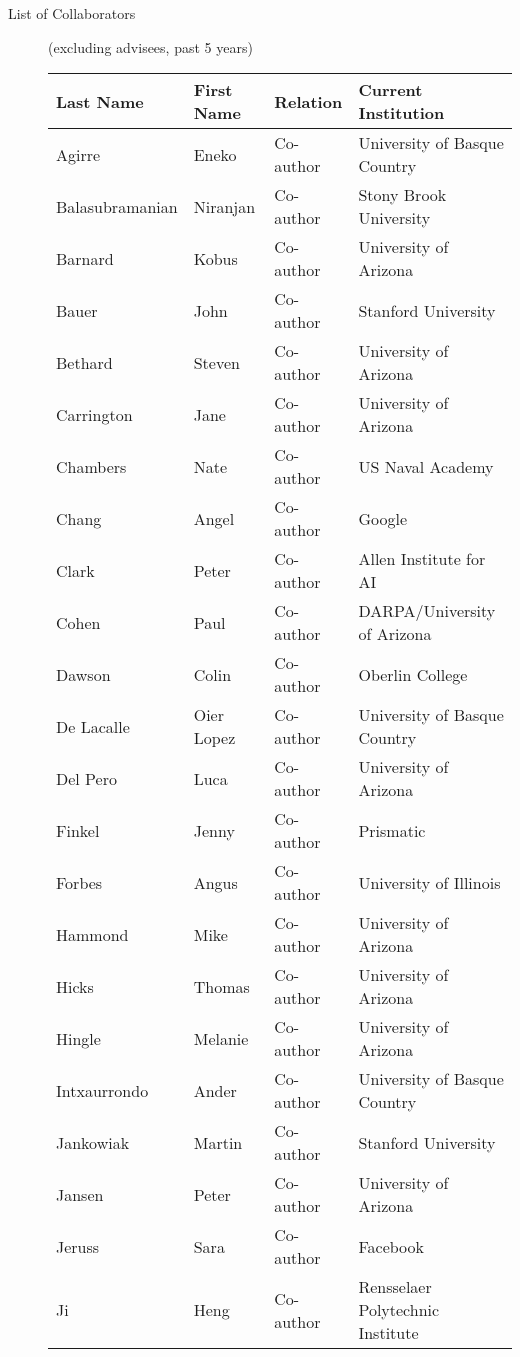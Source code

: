 \documentclass[10pt]{article}
\begin{document}
\begin{description}
\newpage
\vspace{-.1cm}\item [List of Collaborators ] (excluding advisees, past 5 years)\

\begin{center}
 \begin{tabular}{l|l|l|l}
 {\bf Last Name} & {\bf First Name} & {\bf Relation} & {\bf Current Institution} \\
 \hline
Agirre & Eneko & Co-author & University of Basque Country \\
Balasubramanian & Niranjan & Co-author & Stony Brook University \\
Barnard & Kobus & Co-author & University of Arizona \\
Bauer & John & Co-author & Stanford University \\
Bethard & Steven & Co-author & University of Arizona \\
Carrington & Jane & Co-author & University of Arizona \\
Chambers & Nate & Co-author & US Naval Academy \\
Chang & Angel & Co-author & Google \\
Clark & Peter & Co-author & Allen Institute for AI \\
Cohen & Paul & Co-author & DARPA/University of Arizona \\
Dawson & Colin & Co-author & Oberlin College \\
De Lacalle & Oier Lopez & Co-author & University of Basque Country \\
Del Pero & Luca & Co-author & University of Arizona \\
Finkel & Jenny & Co-author & Prismatic \\
Forbes & Angus & Co-author & University of Illinois \\
Hammond & Mike & Co-author & University of Arizona \\
Hicks & Thomas & Co-author & University of Arizona \\
Hingle & Melanie & Co-author & University of Arizona \\
Intxaurrondo & Ander & Co-author & University of Basque Country \\
Jankowiak & Martin & Co-author & Stanford University \\
Jansen & Peter & Co-author & University of Arizona \\
Jeruss & Sara & Co-author & Facebook \\
Ji & Heng & Co-author & Rensselaer Polytechnic Institute \\

\end{tabular}
\end{center}
\end{description}
\end{document}
